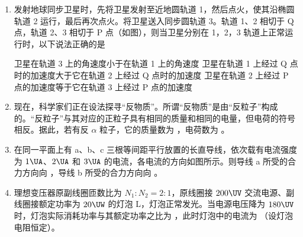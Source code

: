 \documentclass[\gkver]{gaokaozhenti}
\begin{document}
\begin{enumerate}
\item
发射地球同步卫星时，先将卫星发射至近地圆轨道 1，然后点火，使其沿椭圆轨道 2 运行，最后再次点火。将卫星送入同步圆轨道 3。轨道 1、2 相切于 Q 点，轨道 2、3 相切于 P 点（如图），则当卫星分别在 1，2，3 轨道上正常运行时，以下说法正确的是

\onepicture[w=5cm]{}

{卫星在轨道 3 上的角速度小于在轨道 1 上的角速度}
{卫星在轨道 1 上经过 Q 点时的加速度大于它在轨道 2 上经过 Q 点时的加速度}
{卫星在轨道 2 上经过 P 点的加速度等于它在轨道 3 上经过 P 点的加速度}


\item
现在，科学家们正在设法探寻“反物质”。所谓“反物质”是由“反粒子”构成的。“反粒子”与其对应的正粒子具有相同的质量和相同的电量，但电荷的符号相反。据此，若有反 $\alpha$ 粒子，它的质量数为 ，电荷数为 。


\item
在同一平面上有 a、b、c 三根等间距平行放置的长直导线，依次载有电流强度为 $1\UA$、$2\UA$ 和 $3\UA$ 的电流，各电流的方向如图所示。则导线 a 所受的合力方向向 ，导线 b 所受的合力方向向 。

\onepicture[h=4cm, align=right]{}


\item
理想变压器原副线圈匝数比为 $N_{1}:N_{2} = 2:1$，原线圈接 $200\UV$ 交流电源、副线圈接额定功率为 $20\UW$ 的灯泡 L，灯泡正常发光。当电源电压降为 $180\UV$ 时，灯泡实际消耗功率与其额定功率之比为 ，此时灯泡中的电流为 \tkanswer[1.6cm]{$0.18\UA$}（设灯泡电阻恒定）。


\end{enumerate}
\end{document}
